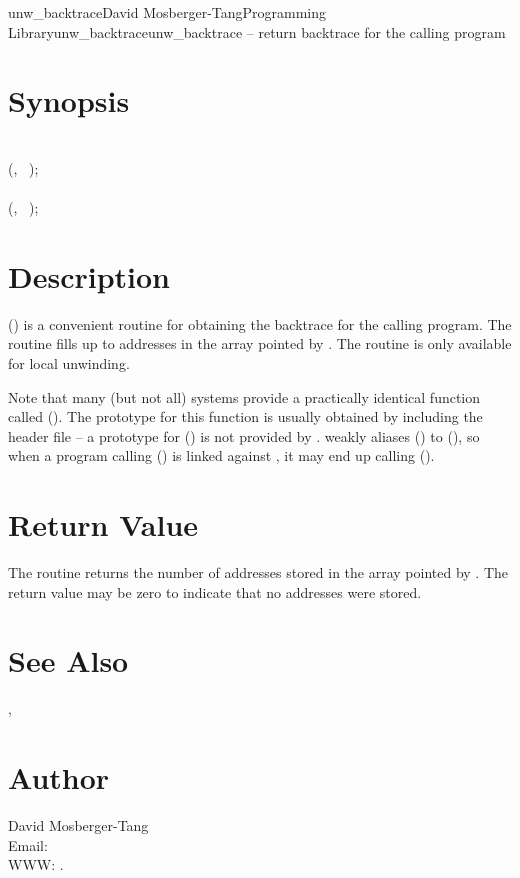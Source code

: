 \documentclass{article}
\begin{document}
\begin{Name}{3}{unw\_backtrace}{David Mosberger-Tang}{Programming Library}{unw\_backtrace}unw\_backtrace -- return backtrace for the calling program
\end{Name}

\section{Synopsis}

\\

 (, ~);\\

\\

 (, ~);\\

\section{Description}

() is a convenient routine for obtaining the backtrace for
the calling program. The routine fills up to  addresses in the array
pointed by . The routine is only available for local unwinding.

Note that many (but not all) systems provide a practically identical function
called (). The prototype for this function is usually obtained
by including the  header file -- a prototype for
() is not provided by .  weakly
aliases () to (), so when a program
calling () is linked against , it may end up
calling ().

\section{Return Value}

The routine returns the number of addresses stored in the array pointed by
. The return value may be zero to indicate that no addresses were
stored.

\section{See Also}

,

\section{Author}

\noindent
David Mosberger-Tang\\
Email: \\
WWW: .
\LatexManEnd
\end{document}
